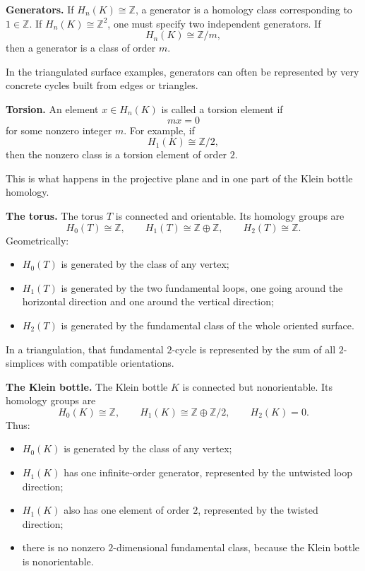 \documentclass[12pt,a4paper]{article}
\theoremstyle{notespace}
\begin{document}
\medskip

\textbf{Generators.}
If \(H_n(K)\cong \mathbb Z\), a generator is a homology class corresponding to \(1\in \mathbb Z\). If \(H_n(K)\cong \mathbb Z^2\), one must specify two independent generators. If
\[
H_n(K)\cong \mathbb Z/m,
\]
then a generator is a class of order \(m\).

In the triangulated surface examples, generators can often be represented by very concrete cycles built from edges or triangles.

\medskip

\textbf{Torsion.}
An element \(x\in H_n(K)\) is called a torsion element if
\[
mx=0
\]
for some nonzero integer \(m\). For example, if
\[
H_1(K)\cong \mathbb Z/2,
\]
then the nonzero class is a torsion element of order \(2\).

This is what happens in the projective plane and in one part of the Klein bottle homology.

\bigskip

\textbf{The torus.}
The torus \(T\) is connected and orientable. Its homology groups are
\[
H_0(T)\cong \mathbb Z,
\qquad
H_1(T)\cong \mathbb Z\oplus \mathbb Z,
\qquad
H_2(T)\cong \mathbb Z.
\]
Geometrically:

\begin{itemize}
	\item \(H_0(T)\) is generated by the class of any vertex;
	\item \(H_1(T)\) is generated by the two fundamental loops, one going around the horizontal direction and one around the vertical direction;
	\item \(H_2(T)\) is generated by the fundamental class of the whole oriented surface.
\end{itemize}

In a triangulation, that fundamental \(2\)-cycle is represented by the sum of all \(2\)-simplices with compatible orientations.

\medskip

\textbf{The Klein bottle.}
The Klein bottle \(K\) is connected but nonorientable. Its homology groups are
\[
H_0(K)\cong \mathbb Z,
\qquad
H_1(K)\cong \mathbb Z\oplus \mathbb Z/2,
\qquad
H_2(K)=0.
\]
Thus:

\begin{itemize}
	\item \(H_0(K)\) is generated by the class of any vertex;
	\item \(H_1(K)\) has one infinite-order generator, represented by the untwisted loop direction;
	\item \(H_1(K)\) also has one element of order \(2\), represented by the twisted direction;
	\item there is no nonzero \(2\)-dimensional fundamental class, because the Klein bottle is nonorientable.
\end{itemize}
\end{document}
